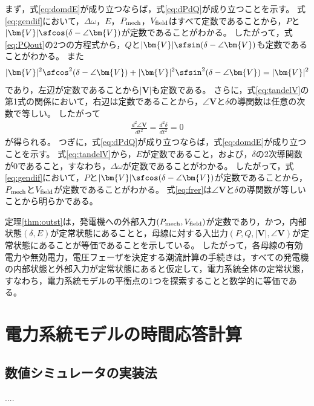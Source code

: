 \documentclass[tombow,dvipdfmx]{corona-a5-1.1}
\begin{document}
\begin{証明}
まず，式\ref{eq:domdE}が成り立つならば，式\ref{eq:dPdQ}が成り立つことを示す。
式\ref{eq:gendif}において，$\Delta \omega$，$E$，$P_{\rm mech}$，$V_{\rm field}$はすべて定数であることから，$P$と$|\bm{V}|\sfcos (\delta - \angle \bm{V})$が定数であることがわかる。
したがって，式\ref{eq:PQout}の2つの方程式から，$Q$と$|\bm{V}|\sfsin (\delta - \angle \bm{V})$も定数であることがわかる。
また
\begin{align*}
|\bm{V}|^2\sfcos^2 (\delta - \angle \bm{V}) +
|\bm{V}|^2\sfsin^2 (\delta - \angle \bm{V}) = |\bm{V}|^2
\end{align*}
であり，左辺が定数であることから$|\bm{V}|$も定数である。
さらに，式\ref{eq:tandelV}の第1式の関係において，右辺は定数であることから，$\angle \bm{V}$と$\delta$の導関数は任意の次数で等しい。
したがって
\begin{align*}
\frac{d^2 \angle \bm{V}}{dt^2} = \frac{d^2 \delta}{dt^2} =0
\end{align*}
が得られる。
つぎに，式\ref{eq:dPdQ}が成り立つならば，式\ref{eq:domdE}が成り立つことを示す。
式\ref{eq:tandelV}から，$E$が定数であること，および，$\delta$の2次導関数が$0$であること，すなわち，$\Delta \omega$が定数であることがわかる。
したがって，式\ref{eq:gendif}において，$P$と$|\bm{V}|\sfcos (\delta - \angle \bm{V})$が定数であることから，$P_{\rm mech}$と$V_{\rm field}$が定数であることがわかる。
式\ref{eq:frer}は$\angle \bm{V}$と$\delta$の導関数が等しいことから明らかである。
\end{証明}

定理\ref{thm:outst}は，発電機への外部入力$(P_{\rm mech},V_{\rm field})$が定数であり，かつ，内部状態$(\delta,E)$が定常状態にあることと，母線に対する入出力$(P,Q,|\bm{V}|,\angle \bm{V})$が定常状態にあることが等価であることを示している。
したがって，各母線の有効電力や無効電力，電圧フェーザを決定する潮流計算の手続きは，すべての発電機の内部状態と外部入力が定常状態にあると仮定して，電力系統全体の定常状態，すなわち，電力系統モデルの平衡点の1つを探索することと数学的に等価である。



\section{電力系統モデルの時間応答計算}\label{sec:numsimtr}

\subsection{数値シミュレータの実装法}
....
\end{document}
